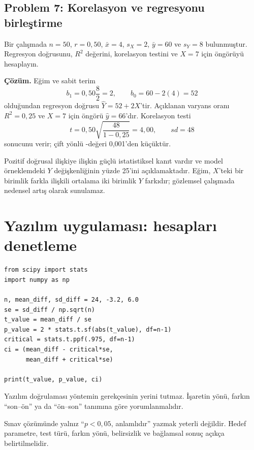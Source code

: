 \subsection*{Problem 7: Korelasyon ve regresyonu birleştirme}

Bir çalışmada $n=50$, $r=0{,}50$, $\bar x=4$, $s_X=2$,
$\bar y=60$ ve $s_Y=8$ bulunmuştur. Regresyon doğrusunu, $R^2$ değerini,
korelasyon testini ve $X=7$ için öngörüyü hesaplayın.

\textbf{Çözüm.} Eğim ve sabit terim
\[
b_1=0{,}50\frac{8}{2}=2,
\qquad b_0=60-2(4)=52
\]
olduğundan regresyon doğrusu $\hat Y=52+2X$'tir. Açıklanan varyans oranı
$R^2=0{,}25$ ve $X=7$ için öngörü $\hat y=66$'dır. Korelasyon testi
\[
t=0{,}50\sqrt{\frac{48}{1-0{,}25}}=4{,}00,
\qquad sd=48
\]
sonucunu verir; çift yönlü \pval-değeri 0,001'den küçüktür.

Pozitif doğrusal ilişkiye ilişkin güçlü istatistiksel kanıt vardır ve model
örneklemdeki $Y$ değişkenliğinin yüzde 25'ini açıklamaktadır. Eğim, $X$'teki
bir birimlik farkla ilişkili ortalama iki birimlik $Y$ farkıdır; gözlemsel
çalışmada nedensel artış olarak sunulamaz.

\section{Yazılım uygulaması: hesapları denetleme}

\begin{softwarebox}
\begin{lstlisting}
from scipy import stats
import numpy as np

n, mean_diff, sd_diff = 24, -3.2, 6.0
se = sd_diff / np.sqrt(n)
t_value = mean_diff / se
p_value = 2 * stats.t.sf(abs(t_value), df=n-1)
critical = stats.t.ppf(.975, df=n-1)
ci = (mean_diff - critical*se,
      mean_diff + critical*se)

print(t_value, p_value, ci)
\end{lstlisting}
Yazılım doğrulaması yöntemin gerekçesinin yerini tutmaz. İşaretin yönü,
farkın ``son--ön'' ya da ``ön--son'' tanımına göre yorumlanmalıdır.
\end{softwarebox}

\begin{mistakebox}
Sınav çözümünde yalnız ``$p<0{,}05$, anlamlıdır'' yazmak yeterli değildir.
Hedef parametre, test türü, farkın yönü, belirsizlik ve bağlamsal sonuç açıkça
belirtilmelidir.
\end{mistakebox}

